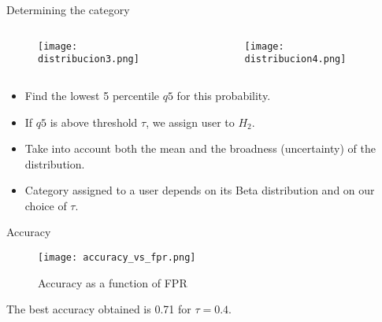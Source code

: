 \documentclass[usenames,dvipsnames]{beamer}
\begin{document}
\begin{frame}{Determining the category}

	\begin{columns}
		\begin{column}{0.49\textwidth}

\begin{figure}[h]
\begin{center}
\texttt{[image: distribucion3.png]}
\end{center}
\end{figure}
\end{column}

\begin{column}{0.49\textwidth}

\begin{figure}[h]
\begin{center}
\texttt{[image: distribucion4.png]}
\end{center}
\end{figure}

\end{column}
\end{columns}


\begin{itemize}

\item Find the lowest 5 percentile $q5$ for this probability. 

\item If $q5$ is above threshold $\tau$, we assign user to $H_2$.

\item Take into account both the mean and the broadness (uncertainty) of the distribution. 

\item Category assigned to a user depends on its Beta distribution and on our choice of $\tau$.
\end{itemize}

\end{frame}


\begin{frame}{Accuracy}

\begin{figure}[p]
\begin{center}
\texttt{[image: accuracy\_vs\_fpr.png]}
\caption{Accuracy as a function of FPR}
\label{fig:accuracy_vs_fpr}
\end{center}
\end{figure}

The best accuracy obtained is \num{0.71} for $\tau = 0.4$.

\end{frame}
\end{document}
